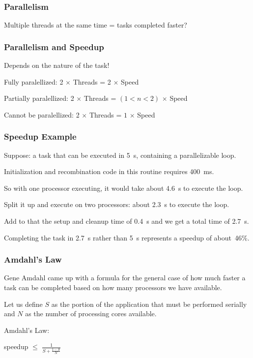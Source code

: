  

\begin{frame}
\frametitle{Parallelism}

Multiple threads at the same time = tasks completed faster?

\end{frame}

\begin{frame}
\frametitle{Parallelism and Speedup}

Depends on the nature of the task!

Fully paralellized: 2 $\times$ Threads = 2 $\times$ Speed

Partially paralellized: 2 $\times$ Threads = $(1 < n < 2)$ $\times$ Speed

Cannot be paralellized: 2 $\times$ Threads = $1$ $\times$ Speed

\end{frame}

 
\begin{frame}
\frametitle{Speedup Example}


Suppose: a task that can be executed in 5~s, containing a parallelizable loop.

Initialization and recombination code in this routine requires 400~ms. 

So with one processor executing, it would take about 4.6~s to execute the loop. 

Split it up and execute on two processors: about 2.3~s to execute the loop. 

Add to that the setup and cleanup time of 0.4~s and we get a total time of 2.7~s. 

Completing the task in 2.7~s rather than 5~s represents a speedup of about~46\%.

\end{frame}

 
\begin{frame}
\frametitle{Amdahl's Law}

Gene Amdahl came up with a formula for the general case of how much faster a task can be completed based on how many processors we have available. 

Let us define $S$ as the portion of the application that must be performed serially and $N$ as the number of processing cores available. 

Amdahl's Law:

\begin{center}
speedup $\leq$ {\huge $\frac{1}{S + \frac{1-S}{N}}$}
\end{center}

\end{frame}

